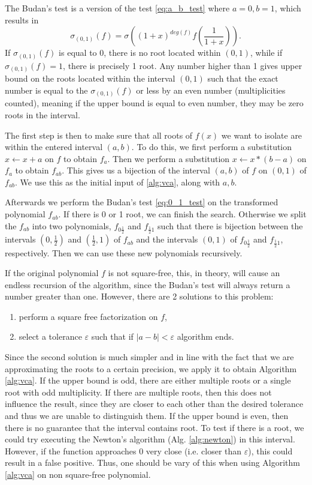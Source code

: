 \documentclass[
  digital, %
  notable,   %
  nolof,     %
  nolot,     %
	final, %
]{fithesis3}
\begin{document}
The Budan's test \parencite{budan} is a version of the test \eqref{eq:a_b_test} where $a=0, b=1$, which results in
\begin{equation}
\sigma_{\left(0,1\right)}(f) = \sigma\left((1 + x)^{deg(f)} f\left(\frac{1}{1 + x}\right)\right).
\label{eq:0_1_test}
\end{equation}
If $\sigma_{\left(0,1\right)}(f)$ is equal to 0, there is no root located within $(0,1)$, while if $\sigma_{\left(0,1\right)}(f) = 1$, there is precisely 1 root. Any number higher than 1 gives upper bound on the roots located within the interval $(0,1)$ such that the exact number is equal to the $\sigma_{\left(0,1\right)}(f)$ or less by an even number (multiplicities counted), meaning if the upper bound is equal to even number, they may be zero roots in the interval.

The first step is then to make sure that all roots of $f(x)$ we want to isolate are within the entered interval $(a,b)$. To do this, we first perform a substitution $x\leftarrow x+a$ on $f$ to obtain $f_{a}$. Then we perform a substitution $x\leftarrow x*(b-a)$ on $f_{a}$ to obtain $f_{ab}$. This gives us a bijection of the interval $(a,b)$ of $f$ on $(0,1)$ of $f_{ab}$. We use this as the initial input of \ref{alg:vca}, along with $a, b$.

Afterwards we perform the Budan's test \eqref{eq:0_1_test} on the transformed polynomial $f_{ab}$. If there is 0 or 1 root, we can finish the search. Otherwise we split the $f_{ab}$ into two polynomials, $f_{0\frac{1}{2}}$ and $f_{\frac{1}{2}1}$ such that there is bijection between the intervals $(0,\frac{1}{2})$ and $(\frac{1}{2},1)$ of $f_{ab}$ and the intervals $(0,1)$ of $f_{0\frac{1}{2}}$ and $f_{\frac{1}{2}1}$, respectively. Then we can use these new polynomials recursively.

If the original polynomial $f$ is not square-free, this, in theory, will cause an endless recursion of the algorithm, since the Budan's test will always return a number greater than one. However, there are 2 solutions to this problem:
\begin{enumerate}
	\item perform a square free factorization on $f$,
	\item select a tolerance $\varepsilon$ such that if $\left|a-b\right|<\varepsilon$ algorithm ends.
\end{enumerate}
Since the second solution is much simpler and in line with the fact that we are approximating the roots to a certain precision, we apply it to obtain Algorithm \ref{alg:vca}. If the upper bound is odd, there are either multiple roots or a single root with odd multiplicity. If there are multiple roots, then this does not influence the result, since they are closer to each other than the desired tolerance and thus we are unable to distinguish them. If the upper bound is even, then there is no guarantee that the interval contains root. To test if there is a root, we could try executing the Newton's algorithm (Alg. \ref{alg:newton}) in this interval. However, if the function approaches 0 very close (i.e. closer than $\varepsilon$), this could result in a false positive. Thus, one should be vary of this when using Algorithm \ref{alg:vca} on non square-free polynomial.
\end{document}
